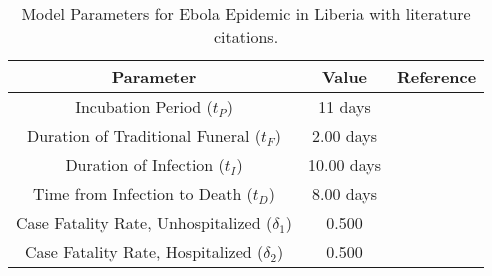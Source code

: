\begin{table}[ht]
\centering %
\begin{tabular}{c c c}
\hline\hline %
Parameter & Value  & Reference \\ [0.5ex]
\hline %
Incubation Period (${t_{P}}$) & 11 days & \cite{WHOFacts} \\
Duration of Traditional Funeral (${t_{F}}$) & 2.00 days & \cite{Rivers2014} \\
Duration of Infection (${t_{I}}$) & 10.00 days & \cite{Rivers2014} \\
Time from Infection to Death (${t_{D}}$) & 8.00 days & \cite{Rivers2014} \\
Case Fatality Rate, Unhospitalized ($\delta_{1}$) & 0.500 & \cite{WHOFacts} \\
Case Fatality Rate, Hospitalized ($\delta_{2}$) & 0.500 & \cite{WHOFacts} \\ [1ex]
\hline
\end{tabular}
\caption{Model Parameters for Ebola Epidemic in Liberia with literature citations.} %
\label{tab:knownParameters}
\end{table}